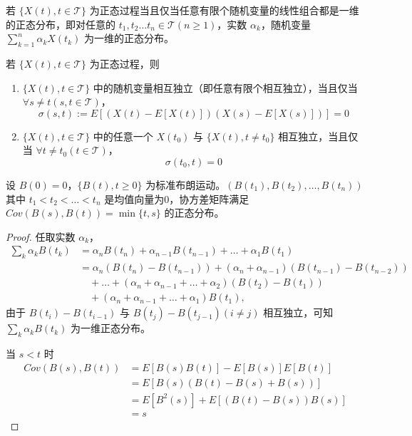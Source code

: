 \documentclass[lang=cn,10pt,thmcnt=section]{elegantbook}
\begin{document}
\begin{theorem}\label{th:5.9}
	若 $\{X(t), t \in \mathcal{T}\}$ 为正态过程当且仅当任意有限个随机变量的线性组合都是一维的正态分布，即对任意的 $t_1, t_2 \ldots t_n \in \mathcal{T} (n \geq 1)$，实数 $\alpha_k$，随机变量 $\sum_{k=1}^{n} \alpha_k X(t_k)$ 为一维的正态分布。

\end{theorem}
\begin{theorem}
	若 $\{X(t), t \in \mathcal{T}\}$ 为正态过程，则
\begin{enumerate}
    \item $\{X(t), t \in \mathcal{T}\}$ 中的随机变量相互独立（即任意有限个相互独立），当且仅当 $\forall s \neq t (s, t \in \mathcal{T})$，
    \[
    \sigma(s, t) := E[(X(t) - E[X(t)])(X(s) - E[X(s)])] = 0
    \]
    \item $\{X(t), t \in \mathcal{T}\}$ 中的任意一个 $X(t_0)$ 与 $\{X(t), t \neq t_0\}$ 相互独立，当且仅当 $\forall t \neq t_0 (t \in \mathcal{T})$，
    \[
    \sigma(t_0, t) = 0
    \]
\end{enumerate}
\end{theorem}
\begin{theorem}\label{th:5.11}
	设 $B(0) = 0$，$\{B(t), t \geq 0\}$ 为标准布朗运动。$(B(t_1), B(t_2), \ldots, B(t_n))$ 其中 $t_1 < t_2 < \ldots < t_n$ 是均值向量为0，协方差矩阵满足 $Cov(B(s), B(t)) = \min\{t, s\}$ 的正态分布。
\end{theorem}
\begin{proof}
	任取实数 $\alpha_k$，
\begin{align*}
\sum_{k} \alpha_k B(t_k) &= \alpha_n B(t_n) + \alpha_{n-1} B(t_{n-1}) + \ldots + \alpha_1 B(t_1) \\
&= \alpha_n (B(t_n) - B(t_{n-1})) + (\alpha_n + \alpha_{n-1})(B(t_{n-1}) - B(t_{n-2})) \\
&\quad + \ldots + (\alpha_n + \alpha_{n-1} + \ldots + \alpha_2)(B(t_2) - B(t_1)) \\
&\quad + (\alpha_n + \alpha_{n-1} + \ldots + \alpha_1)B(t_1),
\end{align*}
由于 $B(t_i) - B(t_{i-1})$ 与 $B(t_j) - B(t_{j-1}) (i \neq j)$ 相互独立，可知 $\sum_{k} \alpha_k B(t_k)$ 为一维正态分布。

当 $s < t$ 时
\begin{align*}
Cov(B(s), B(t)) &= E[B(s)B(t)] - E[B(s)]E[B(t)] \\
&= E[B(s)(B(t) - B(s) + B(s))] \\
&= E[B^2(s)] + E[(B(t) - B(s))B(s)] \\
&= s
\end{align*}
\end{proof}
\end{document}
